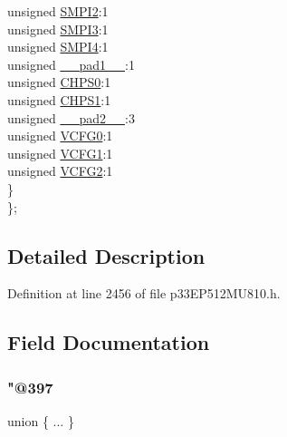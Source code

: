 \begin{DoxyCompactItemize}
\begin{tabbing}
\>\>unsigned \hyperlink{structtag_a_d1_c_o_n2_b_i_t_s_adb1da20ec13bb004bccc5f06d05bc3a3}{SMPI2}:1\\
\>\>unsigned \hyperlink{structtag_a_d1_c_o_n2_b_i_t_s_a06a0346923c0c09a9454cf96fa3f9b45}{SMPI3}:1\\
\>\>unsigned \hyperlink{structtag_a_d1_c_o_n2_b_i_t_s_a09ac71af764e46df0ba15b58c00453f6}{SMPI4}:1\\
\>\>unsigned \hyperlink{structtag_a_d1_c_o_n2_b_i_t_s_acaf2d0924a107ec6e8d2e31febaf66f9}{\_\_pad1\_\_}:1\\
\>\>unsigned \hyperlink{structtag_a_d1_c_o_n2_b_i_t_s_a168ecde86660bcc75ca7e3f19f64cad4}{CHPS0}:1\\
\>\>unsigned \hyperlink{structtag_a_d1_c_o_n2_b_i_t_s_ab14031d35200a8ed965c3a57eb8178ef}{CHPS1}:1\\
\>\>unsigned \hyperlink{structtag_a_d1_c_o_n2_b_i_t_s_a4d97cc5f7d51d22fc2bf3eab35c9cb7f}{\_\_pad2\_\_}:3\\
\>\>unsigned \hyperlink{structtag_a_d1_c_o_n2_b_i_t_s_afb91efccb5c64031ed340b5f78a99568}{VCFG0}:1\\
\>\>unsigned \hyperlink{structtag_a_d1_c_o_n2_b_i_t_s_abdb5b9805fa4bb09217bb2b134565c1a}{VCFG1}:1\\
\>\>unsigned \hyperlink{structtag_a_d1_c_o_n2_b_i_t_s_ad26fd7d13c850437b5d14a6e95f47483}{VCFG2}:1\\
\>\} \\
\}; \\

\end{tabbing}\end{DoxyCompactItemize}


\subsection{Detailed Description}


Definition at line 2456 of file p33\+E\+P512\+M\+U810.\+h.



\subsection{Field Documentation}
\mbox{\label{structtag_a_d1_c_o_n2_b_i_t_s_aa4d186f2f85f5a57620a6158ac791de3}} 
\subsubsection{\texorpdfstring{"@397}{@397}}
{\footnotesize\ttfamily union \{ ... \} }

